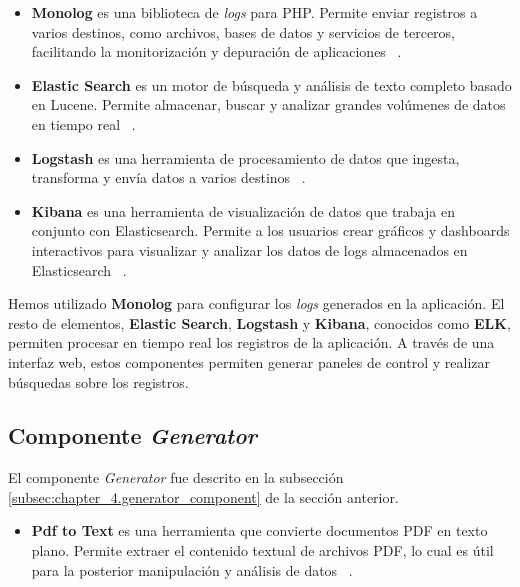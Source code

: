 \begin{itemize}
    \item \textbf{Monolog} es una biblioteca de \textit{logs} para PHP. Permite enviar registros a varios destinos, como
    archivos, bases de datos y servicios de terceros, facilitando la monitorización y depuración de aplicaciones
    ~\cite{https://github.com/Seldaek/monolog}.
    \item \textbf{Elastic Search} es un motor de búsqueda y análisis de texto completo basado en Lucene.
    Permite almacenar, buscar y analizar grandes volúmenes de datos en tiempo real
    ~\cite{https://www.elastic.co/guide/en/elasticsearch/reference/current/index.html}.
    \item \textbf{Logstash} es una herramienta de procesamiento de datos que ingesta, transforma y envía datos a varios
    destinos ~\cite{https://www.elastic.co/guide/en/logstash/current/index.html}.
    \item \textbf{Kibana} es una herramienta de visualización de datos que trabaja en conjunto con Elasticsearch.
    Permite a los usuarios crear gráficos y dashboards interactivos para visualizar y analizar los datos de logs
    almacenados en Elasticsearch ~\cite{https://www.elastic.co/guide/en/kibana/current/index.html}.
\end{itemize}

Hemos utilizado \textbf{Monolog} para configurar los \textit{logs} generados en la aplicación.
El resto de elementos, \textbf{Elastic Search}, \textbf{Logstash} y \textbf{Kibana}, conocidos como \textbf{ELK},
permiten procesar en tiempo real los registros de la aplicación.
A través de una interfaz web, estos componentes permiten generar paneles de control y realizar búsquedas sobre los
registros.

\subsection*{Componente \textit{Generator}}

El componente \textit{Generator} fue descrito en la subsección \ref{subsec:chapter_4.generator_component}
de la sección anterior.

\begin{itemize}
    \item \textbf{Pdf to Text} es una herramienta que convierte documentos PDF en texto plano.
    Permite extraer el contenido textual de archivos PDF, lo cual es útil para la posterior manipulación y análisis de
    datos ~\cite{https://www.xpdfreader.com/pdftotext-man.html}.
\end{itemize}

